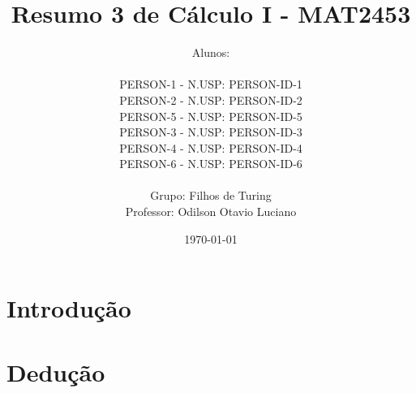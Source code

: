 \documentclass[12pt, a4paper]{article}
\title{
	Resumo 3 de Cálculo I - MAT2453
}
\author{
	Alunos:
	\\  
	\\ {{PERSON-1}} - N.USP: {{PERSON-ID-1}}
	\\ {{PERSON-2}} - N.USP: {{PERSON-ID-2}}
	\\ {{PERSON-5}} - N.USP: {{PERSON-ID-5}}
	\\ {{PERSON-3}} - N.USP: {{PERSON-ID-3}}
	\\ {{PERSON-4}} - N.USP: {{PERSON-ID-4}}
	\\ {{PERSON-6}} - N.USP: {{PERSON-ID-6}}
	\\ \\
	Grupo: Filhos de Turing
	\\ Professor: Odilson Otavio Luciano
}
\date{\today}
\begin{document}
	\maketitle
	\thispagestyle{empty}
	\newpage

	\tableofcontents
	
	\newpage

	\section{Introdução}

	
	\newpage

	\section{Dedução}

	
	\newpage
\end{document}
